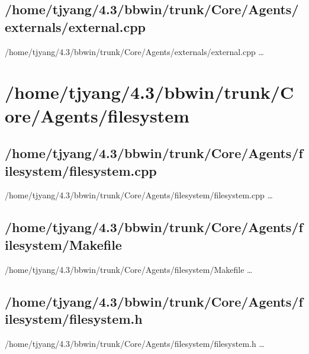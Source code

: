 \subsection{/home/tjyang/4.3/bbwin/trunk/Core/Agents/externals/external.cpp}
\lstset{numberstyle=\tiny,numbers=left,
   breaklines=true,
   stepnumber=1,numbersep=5pt,firstnumber=1,
   xleftmargin=12pt,showstringspaces=false}
\noindent /home/tjyang/4.3/bbwin/trunk/Core/Agents/externals/external.cpp  \ldots



\section{/home/tjyang/4.3/bbwin/trunk/Core/Agents/filesystem}

\subsection{/home/tjyang/4.3/bbwin/trunk/Core/Agents/filesystem/filesystem.cpp}
\lstset{numberstyle=\tiny,numbers=left,
   breaklines=true,
   stepnumber=1,numbersep=5pt,firstnumber=1,
   xleftmargin=12pt,showstringspaces=false}
\noindent /home/tjyang/4.3/bbwin/trunk/Core/Agents/filesystem/filesystem.cpp  \ldots



\subsection{/home/tjyang/4.3/bbwin/trunk/Core/Agents/filesystem/Makefile}
\lstset{numberstyle=\tiny,numbers=left,
   breaklines=true,
   stepnumber=1,numbersep=5pt,firstnumber=1,
   xleftmargin=12pt,showstringspaces=false}
\noindent /home/tjyang/4.3/bbwin/trunk/Core/Agents/filesystem/Makefile  \ldots



\subsection{/home/tjyang/4.3/bbwin/trunk/Core/Agents/filesystem/filesystem.h}
\lstset{numberstyle=\tiny,numbers=left,
   breaklines=true,
   stepnumber=1,numbersep=5pt,firstnumber=1,
   xleftmargin=12pt,showstringspaces=false}
\noindent /home/tjyang/4.3/bbwin/trunk/Core/Agents/filesystem/filesystem.h  \ldots





